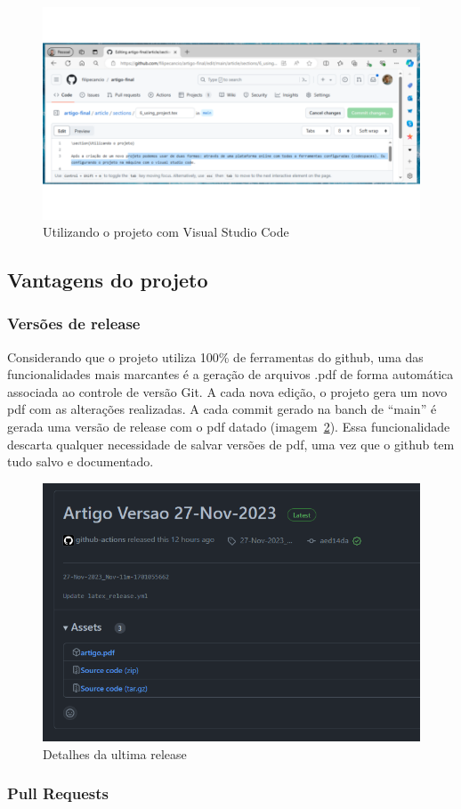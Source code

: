 \begin{figure}[ht]
	\centering
	\includegraphics[width=.6\textwidth]{./images/fig03.png}
	\caption{Utilizando o projeto com Visual Studio Code}
	\label{fig:fig03}
\end{figure}

\subsection{Vantagens do projeto}

\subsubsection{Versões de release}
Considerando que o projeto utiliza 100\% de ferramentas do github, uma das funcionalidades mais marcantes é a geração de arquivos .pdf de forma automática associada ao controle de versão Git. A cada nova edição, o projeto gera um novo pdf com as alterações realizadas. A cada commit gerado na banch de ``main'' é gerada uma versão de release com o pdf datado (imagem~\ref{fig:fig04}). Essa funcionalidade descarta qualquer necessidade de salvar versões de pdf, uma vez que o github tem tudo salvo e documentado.

\begin{figure}[ht]
	\centering
	\includegraphics[width=.6\textwidth]{./images/fig04.png}
	\caption{Detalhes da ultima release}
	\label{fig:fig04}
\end{figure}

\subsubsection{Pull Requests}

